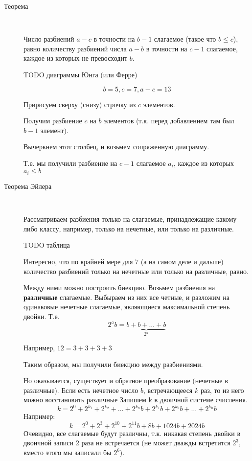 \begin{description}
\item[Теорема]~	

Число разбиений $ a-c $ в точности на $ b-1 $  слагаемое (такое что $ b \le c $), равно количеству 
разбиений числа $a-b$ в точности на $c-1$ слагаемое, каждое из которых не превосходит $b$.

TODO диаграммы Юнга (или Ферре)

$$
b = 5, c = 7, a - c = 13
$$

Пририсуем сверху (снизу) строчку из $c$ элементов.

Получим разбиение $c$ на $b$ элементов (т.к. перед добавлением там был $b-1$ элемент).

Вычеркнем этот столбец, и возьмем сопряженную диаграмму.

Т.е. мы получили разбиение на $c-1$ слагаемое $a_i$, каждое из которых $ a_i \le b$

\end{description}


\begin{description}
\item[Теорема Эйлера]~	

Рассматриваем разбиения только на слагаемые, принадлежащие какому-либо классу, например, только на нечетные, или только на различные.

TODO таблица

Интересно, что по крайней мере для 7 (а на самом деле и дальше) количество разбиений только на нечетные или только на различные, равно.

Между ними можно построить биекцию.
Возьмем разбиения на \textbf{различные} слагаемые. Выбыраем из них все четные, и разложим на одинаковые нечетные слагаемые, являющиеся максимальной степень двойки.
Т.е.
$$
2^a b = \underbrace{b + b + \ldots +b}_{2^a}
$$

Например, $12 = 3+3+3+3$

Таким образом, мы получили биекцию между разбиениями.

Но оказывается, существует и обратное преобразование (нечетные в различные).
Если есть нечетное число $ b $, встречающееся $ k $ раз, то из него можно восстановить различные
Запишем k в двоичной системе счисления.
$$
k = 2^0 + 2^{k_1} + 2^{k_2} + \ldots + 2^{k_n}
b + 2^{k_1} b + 2^{k_2} b +\ldots + 2^{k_n} b
$$
Например:
$$
k = 2^0 + 2^3 + 2^{10} + 2^{11}
b + 8 b + 1024 b + 2024 b
$$
Очевидно, все слагаемые будут различны, т.к. никакая степень двойки в двоичной записи 2 раза не встречается (не может дважды встретится $ 2^3 $, вместо этого мы записали бы  $ 2^6 $).


\end{description}





